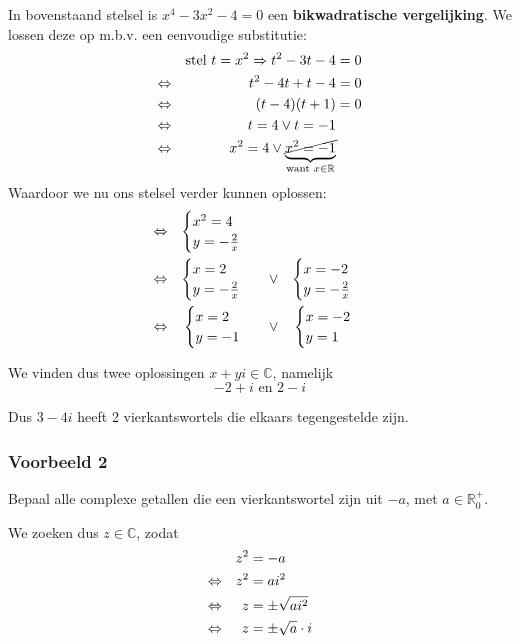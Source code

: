 \documentclass[12pt,twoside,a4]{article}
\begin{document}
In bovenstaand stelsel is $x^4-3x^2-4=0$ een {\bf bikwadratische vergelijking}. We lossen deze op m.b.v. een eenvoudige substitutie:
\begin{align*}
  &&\mbox{stel } t=x^2
  \Rightarrow t^2-3t-4&=0\\
  \Leftrightarrow && t^2-4t+t-4 &= 0\\
  \Leftrightarrow && (t-4)(t+1) &= 0\\
  \Leftrightarrow && t=4 \vee t=-1\\
  \Leftrightarrow && x^2=4 \vee \underbrace{\cancel{x^2=-1}}_{\text{want }x\in\mathbb{R}}
\end{align*}
Waardoor we nu ons stelsel verder kunnen oplossen:
\begin{align*}
  \Leftrightarrow && \begin{cases}x^2=4\\y=-\frac{2}{x}\end{cases}\\
  \Leftrightarrow && \begin{cases}x=2\\y=-\frac{2}{x}\end{cases} &&\vee&& \begin{cases}x=-2\\y=-\frac{2}{x}\end{cases}\\
  \Leftrightarrow && \begin{cases}x=2\\y=-1\end{cases} &&\vee&& \begin{cases}x=-2\\y=1\end{cases}
\end{align*}

We vinden dus twee oplossingen $x+yi\in\mathbb{C}$, namelijk
$$-2+i \mbox{ en } 2-i$$

Dus $3-4i$ heeft 2 vierkantswortels die elkaars tegengestelde zijn.

\subsubsection*{Voorbeeld 2}

Bepaal alle complexe getallen die een vierkantswortel zijn uit $-a$, met $a\in\mathbb{R}^+_0$.

We zoeken dus $z \in \mathbb{C}$, zodat
\begin{align*}
              && z^2 &= -a\\
         \Leftrightarrow && z^2 &= ai^2\\
         \Leftrightarrow && z   &= \pm \sqrt{ai^2}\\
         \Leftrightarrow && z   &= \pm \sqrt{a}\cdot i
\end{align*}
\end{document}
